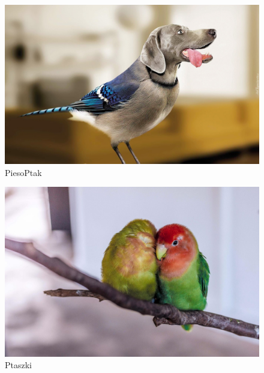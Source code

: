 \documentclass[a4paper,12pt,twoside]{article}
\begin{document}
\renewcommand{\arraystretch}{3}

\begin{figure}[H]
\centerline{\includegraphics[scale=0.2]{piesoptak}}
\caption{PiesoPtak}
\label{fig:piesoptak}
\end{figure}

\begin{figure}[H]
\centerline{\includegraphics[scale=1]{ptoszki}}
\caption{Ptaszki}
\label{fig:ptaszki}
\end{figure}

\renewcommand\theadset{\def\arraystretch{2.85}}
\end{document}
